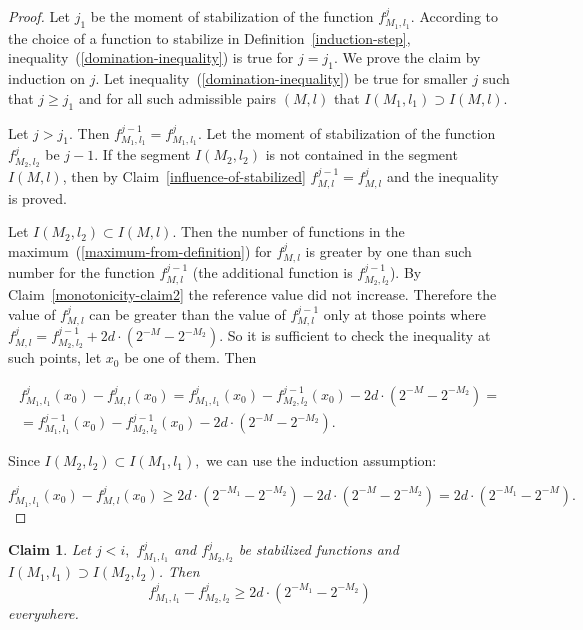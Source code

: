 \documentclass[12pt]{article}
\newtheorem{clai}[prop]{Claim}
\theoremstyle{definition}
\begin{document}
\begin{proof}
Let $j_1$ be the moment of stabilization of the function $f_{M_1, l_1}^j.$ According to the choice of a function to stabilize in Definition~\ref{induction-step}, inequality~(\ref{domination-inequality}) is true for $j=j_1$. We prove the claim by induction on $j$. Let inequality~(\ref{domination-inequality}) be true for smaller $j$ such that $j\ge j_1$ and for all such admissible pairs $(M,l)$ that $I(M_1,l_1)\supset I(M,l).$


Let $j>j_1.$ Then $f_{M_1, l_1}^{j-1} = f_{M_1, l_1}^{j}$. Let the moment of stabilization of the function $f_{M_2, l_2}^{j}$ be $j-1$. If the segment $I(M_2,l_2)$ is not contained in the segment $I(M,l)$, then by Claim~\ref{influence-of-stabilized} $f_{M, l}^{j-1}=f_{M, l}^{j}$ and the inequality is proved.

Let $I(M_2,l_2)\subset I(M,l).$ Then the number of functions in the maximum~(\ref{maximum-from-definition}) for $f_{M, l}^{j}$ is greater by one than such number for the function $f_{M, l}^{j-1}$ (the additional function is $f_{M_2, l_2}^{j-1}$). By Claim~\ref{monotonicity-claim2} the reference value did not increase. Therefore the value of $f_{M, l}^{j}$ can be greater than the value of $f_{M, l}^{j-1}$ only at those points where $f_{M, l}^{j} = f_{M_2, l_2}^{j-1} + 2d\cdot \left(2^{-M} - 2^{-M_2}\right).$ So it is sufficient to check the inequality at such points, let $x_0$ be one of them. Then

\begin{multline*}
f_{M_1, l_1}^{j}(x_0) - f_{M, l}^{j}(x_0) = f_{M_1, l_1}^{j}(x_0) - f_{M_2, l_2}^{j-1}(x_0) - 2d\cdot \left(2^{-M} - 2^{-M_2}\right) = \\
= f_{M_1, l_1}^{j-1}(x_0) - f_{M_2, l_2}^{j-1}(x_0) - 2d\cdot \left(2^{-M} - 2^{-M_2}\right).
\end{multline*}

Since $I(M_2,l_2)\subset I(M_1,l_1),$ we can use the induction assumption:

$$
f_{M_1, l_1}^{j}(x_0) - f_{M, l}^{j}(x_0) \ge 2d\cdot \left(2^{-M_1} - 2^{-M_2}\right) - 2d\cdot \left(2^{-M} - 2^{-M_2}\right) = 2d\cdot \left(2^{-M_1} - 2^{-M}\right).
$$

\end{proof}

\begin{clai}
\label{domination-of-stabilized2}
Let $j<i,$ $f_{M_1, l_1}^j$ and $f_{M_2, l_2}^j$ be stabilized functions and $I(M_1,l_1)\supset I(M_2,l_2)$.
Then
\begin{equation}
\label{domination-inequality2}
f_{M_1, l_1}^{j} - f_{M_2, l_2}^{j} \ge 2d\cdot \left(2^{-M_1} - 2^{-M_2}\right)
\end{equation}
everywhere.
\end{clai}
\end{document}
